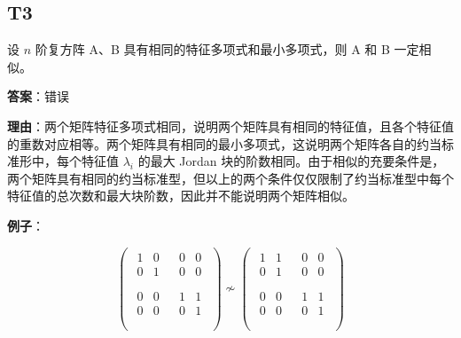 \documentclass{article}
\begin{document}
\subsection{T3}

\par 设 $n$ 阶复方阵 A、B 具有相同的特征多项式和最小多项式，则 A 和 B 一定相似。

\par \textbf{答案}：错误

\par \textbf{理由}：两个矩阵特征多项式相同，说明两个矩阵具有相同的特征值，且各个特征值的重数对应相等。两个矩阵具有相同的最小多项式，这说明两个矩阵各自的约当标准形中，每个特征值 $\lambda_i$ 的最大 Jordan 块的阶数相同。由于相似的充要条件是，两个矩阵具有相同的约当标准型，但以上的两个条件仅仅限制了约当标准型中每个特征值的总次数和最大块阶数，因此并不能说明两个矩阵相似。

\par \textbf{例子}：

\begin{equation*}
	\begin{pmatrix}
		\begin{matrix}
			\boxed{1} & 0\\
			0 & \boxed{1}\\
		\end{matrix} &
		\begin{matrix}
			0 & 0\\
			0 & 0\\
		\end{matrix}\\
		\begin{matrix}
			0 & 0\\
			0 & 0\\
		\end{matrix} &
		\boxed{\begin{matrix}
				1 & 1\\
				0 & 1\\
		\end{matrix}}\\
	\end{pmatrix} \nsim
	\begin{pmatrix}
		\boxed{\begin{matrix}
				1 & 1\\
				0 & 1\\
		\end{matrix}}&
		\begin{matrix}
			0 & 0\\
			0 & 0\\
		\end{matrix}\\
		\begin{matrix}
			0 & 0\\
			0 & 0\\
		\end{matrix}&
		\boxed{\begin{matrix}
			1 & 1\\
			0 & 1\\
		\end{matrix}}\\
	\end{pmatrix}
\end{equation*}
\end{document}
